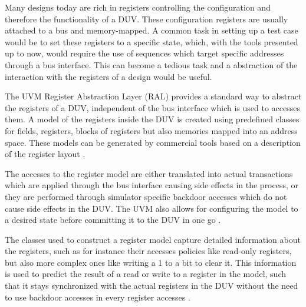 Many designs today are rich in registers controlling the configuration and therefore the functionality of a DUV.
These configuration registers are usually attached to a bus and memory-mapped. A common task in setting up a test
case would be to set these registers to a specific state, which, with the tools presented up to now, would require
the use of sequences which target specific addresses through a bus interface. This can become a tedious task and a
abstraction of the interaction with the registers of a design would be useful.

The UVM Register Abstraction Layer (RAL) provides a standard way to abstract the registers of a DUV, independent of
the bus interface which is used to accesses them. A model of the registers inside the DUV is created using predefined
classes for fields, registers, blocks of registers but also memories mapped into an address space. These models can
be generated by commercial tools based on a description of the register layout \cite{uvm_ral}.

The accesses to the register model are either translated into actual transactions which are applied through the bus
interface causing side effects in the process, or they are performed through simulator specific backdoor accesses
which do not cause side effects in the DUV. The UVM also allows for configuring the model to a desired state before
committing it to the DUV in one go \cite{uvm_ral}.

The classes used to construct a register model capture detailed information about the registers, such as for instance
their accesses policies like read-only registers, but also more complex ones like writing a 1 to a bit to clear it.
This information is used to predict the result of a read or write to a register in the model, such that it stays
synchronized with the actual registers in the DUV without the need to use backdoor accesses in every register
accesses \cite{uvm_ral}.

